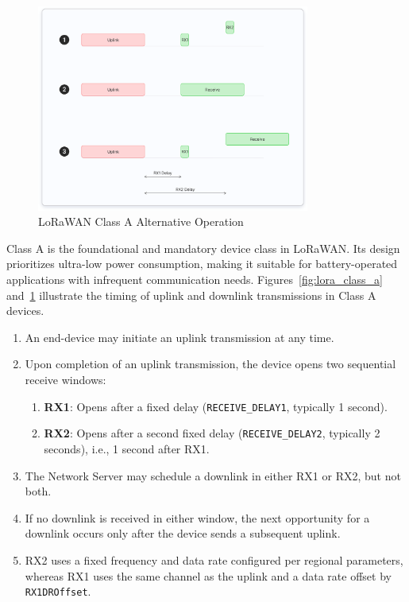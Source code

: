 \begin{figure}
    \centering
    \includegraphics[width=0.8\textwidth]{figures/class-a-alt.png}
    \caption{LoRaWAN Class A Alternative Operation}
    \label{fig:lora_class_a_alt}
\end{figure}

Class A is the foundational and mandatory device class in LoRaWAN. Its design prioritizes ultra-low power consumption, making it suitable for battery-operated applications with infrequent communication needs.
Figures~\ref{fig:lora_class_a} and~\ref{fig:lora_class_a_alt} illustrate the timing of uplink and downlink transmissions in Class A devices.

\begin{enumerate}
    \item An end-device may initiate an uplink transmission at any time.
    \item Upon completion of an uplink transmission, the device opens two sequential receive windows:
          \begin{enumerate}
              \item \textbf{RX1}: Opens after a fixed delay (\texttt{RECEIVE\_DELAY1}, typically 1 second).
              \item \textbf{RX2}: Opens after a second fixed delay (\texttt{RECEIVE\_DELAY2}, typically 2 seconds), i.e., 1 second after RX1.
          \end{enumerate}
    \item The Network Server may schedule a downlink in either RX1 or RX2, but not both.
    \item If no downlink is received in either window, the next opportunity for a downlink occurs only after the device sends a subsequent uplink.
    \item RX2 uses a fixed frequency and data rate configured per regional parameters, whereas RX1 uses the same channel as the uplink and a data rate offset by \texttt{RX1DROffset}.
\end{enumerate}

